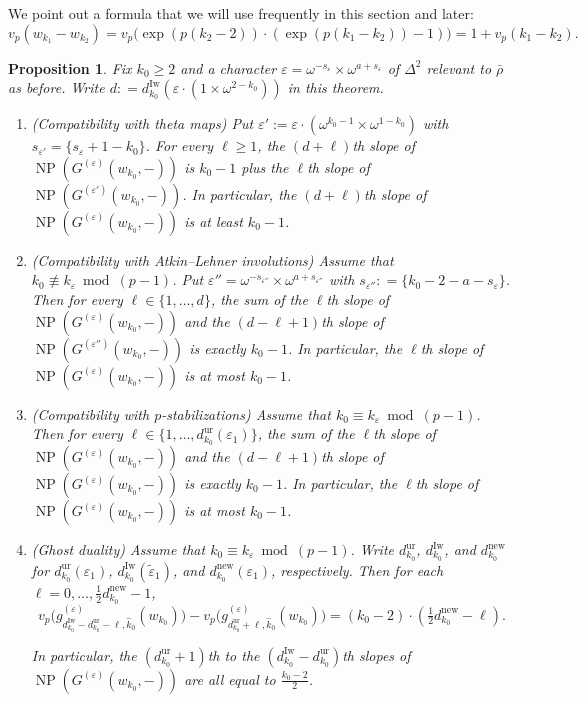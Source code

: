 \documentclass[12pt]{amsart}
\newtheorem{proposition}[subsection]{Proposition}
\theoremstyle{definition}
\numberwithin{equation}{subsection}
\DeclareMathOperator{\NP}{NP}
\newcommand{\new}{\mathrm{new}}
\newcommand{\Iw}{\mathrm{Iw}}
\newcommand{\unr}{\mathrm{ur}}
\begin{document}
We point out a formula that we will use frequently in this section and later:
\begin{equation}
\label{E:vp of k1-k2}
v_p(w_{k_1} - w_{k_2}) = v_p\big(\exp(p(k_2-2)) \cdot (\exp(p(k_1-k_2))-1)\big) =  1+ v_p(k_1-k_2).
\end{equation}
\begin{proposition}
\label{P:ghost compatible with theta AL and p-stabilization}
Fix $k_0 \geq 2$ and a character $\varepsilon= \omega^{-s_\varepsilon} \times \omega^{a+s_\varepsilon}$ of $\Delta^2$ relevant to $\bar \rho$ as before. Write $d: = d_{k_0}^\Iw(\varepsilon\cdot (1\times \omega^{2-k_0}))$ in this theorem.
\begin{enumerate}
\item (Compatibility with theta maps)
Put $\varepsilon' := \varepsilon \cdot (\omega^{k_0-1} \times \omega^{1-k_0})$ with $s_{\varepsilon'} = \{s_\varepsilon +1-k_0\}$. For every $\ell\geq 1$, the $(d+\ell)$th slope of $\NP(G^{(\varepsilon)}(w_{k_0}, -))$ is $k_0-1$ plus the  $\ell$th slope of $\NP(G^{(\varepsilon')}(w_{k_0}, -))$.
In particular, the $(d+\ell)$th slope of $\NP(G^{(\varepsilon)}(w_{k_0}, -))$ is at least ${k_0}-1$.

\item (Compatibility with Atkin--Lehner involutions)
Assume that ${k_0}\not \equiv k_\varepsilon \bmod{(p-1)}$.
Put $\varepsilon'' = \omega^{-s_{\varepsilon''}} \times \omega^{a+s_{\varepsilon''}}$ with $s_{\varepsilon''}: = \{{k_0}-  2-a-s_\varepsilon\}$.  Then for every $\ell \in \{1, \dots, d\}$, the sum of the $\ell$th slope of $\NP(G^{(\varepsilon)}(w_{k_0}, -))$ and the $(d-\ell+1)$th slope of $\NP(G^{(\varepsilon'')}(w_{k_0}, -))$ is exactly ${k_0}-1$.
In particular, the $\ell$th slope of $\NP(G^{(\varepsilon)}(w_{k_0}, -))$ is at most $k_0-1$.

\item (Compatibility with $p$-stabilizations)
Assume that ${k_0}\equiv k_\varepsilon \bmod {(p-1)}$. Then for every $\ell \in \{1, \dots, d_{k_0}^\unr(\varepsilon_1)\}$, the sum of the $\ell$th slope of $\NP(G^{(\varepsilon)}(w_{k_0}, -))$ and the $(d-\ell+1)$th slope of $\NP(G^{(\varepsilon)}(w_{k_0}, -))$ is exactly ${k_0}-1$.
In particular, the $\ell$th slope of $\NP(G^{(\varepsilon)}(w_{k_0}, -))$ is at most ${k_0}-1$.
\item (Ghost duality)
Assume that ${k_0} \equiv k_\varepsilon \bmod{(p-1)}$. Write $d_{k_0}^\unr$, $d_{k_0}^\Iw$, and $d_{k_0}^{\new}$ for $d_{k_0}^\unr(\varepsilon_1)$, $d_{k_0}^\Iw(\tilde \varepsilon_1)$, and $d_{k_0}^{\new}(\varepsilon_1)$, respectively.
Then for each $\ell = 0, \dots,\frac 12 d_{k_0}^{\new}-1$,
\begin{equation}
\label{E:ghost duality}
v_p\big(g_{d_{k_0}^\Iw - d_{k_0}^\unr -\ell, \hat k_0}^{(\varepsilon)} (w_{k_0}) \big) - v_p\big(g_{ d_{k_0}^\unr +\ell, \hat k_0}^{(\varepsilon)} (w_{k_0}) \big) = ({k_0}-2) \cdot (\tfrac 12d_{k_0}^{\new} - \ell).
\end{equation}

In particular, the $(d_{k_0}^\unr+1)$th to the $(d_{k_0}^\Iw-d_{k_0}^\unr)$th slopes of $\NP(G^{(\varepsilon)}(w_{k_0},-))$ are all equal to $\frac{{k_0}-2}2$. 
\end{enumerate}
\end{proposition}
\end{document}
